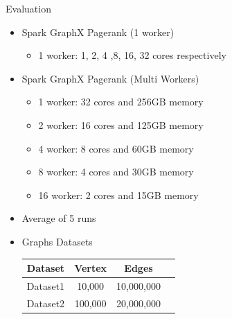 \documentclass{beamer}
\begin{document}
\begin{frame}{Evaluation}
    \begin{itemize}
            \begin{itemize}
                \item{Spark GraphX Pagerank (1 worker)}
                    \begin{itemize}
                        \item{1 worker: 1, 2, 4 ,8, 16, 32 cores respectively}
                    \end{itemize}
                \item{Spark GraphX Pagerank (Multi Workers)}
                    \begin{itemize}
                        \item{1 worker: 32 cores and 256GB memory}
                        \item{2 worker: 16 cores and 125GB memory}
                        \item{4 worker: 8 cores and 60GB memory}
                        \item{8 worker: 4 cores and 30GB memory}
                        \item{16 worker: 2 cores and 15GB memory}
                    \end{itemize}

                \item{Average of 5 runs}

                \item{Graphs Datasets}
                    \begin{table}
                        \centering
                        \begin{tabular}{|l|c|c|c|}
                            \hline
                            \rowcolor{blue} 
                            \color{white}\textbf{Dataset} &\color{white}
                            \textbf{Vertex} &\color{white} \textbf{Edges} \\
                            \hline
                            Dataset1  &10,000  &10,000,000 \\
                            \hline
                            Dataset2   &100,000  &20,000,000 \\
                            \hline
                        \end{tabular}
                    \end{table}
            \end{itemize}
    \end{itemize}
\end{frame}
\end{document}
